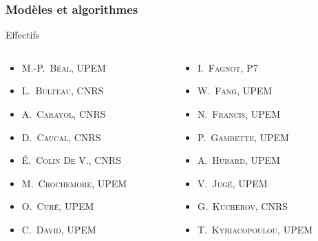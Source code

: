 \documentclass[]{beamer}
\begin{document}
\begin{frame}
  \frametitle{Modèles et algorithmes}

  \begin{block}{Effectifs}
    \begin{overprint}
      \begin{columns}
        \begin{column}{0.5\textwidth}
          \begin{itemize}
            \item \textsc{M.-P.~Béal}, UPEM
            \item \textsc{L.~Bulteau}, CNRS
            \item \textsc{A.~Carayol}, CNRS
            \item \textsc{D.~Caucal}, CNRS
            \item \textsc{\'E.~Colin De V.}, CNRS
            \item \textsc{M.~Crochemore}, UPEM
            \item \textsc{O.~Curé}, UPEM
            \item \textsc{C.~David}, UPEM
          \end{itemize}
        \end{column}

        \begin{column}{0.5\textwidth}
          \begin{itemize}
            \item \textsc{I.~Fagnot}, P7
            \item \textcolor{Nouveau}{\textsc{W.~Fang}, UPEM}
            \item \textsc{N.~Francis}, UPEM
            \item \textsc{P.~Gambette}, UPEM
            \item \textsc{A.~Hubard}, UPEM
            \item \textsc{V.~Jugé}, UPEM
            \item \alert{\textsc{G.~Kucherov}, CNRS}
            \item \textsc{T.~Kyriacopoulou}, UPEM
          \end{itemize}
        \end{column}
      \end{columns}


\end{overprint}
\end{block}
\end{frame}
\end{document}
